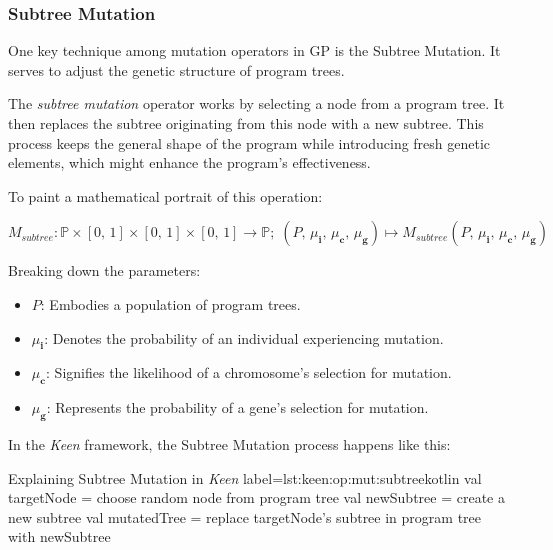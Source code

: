 \subsubsection{Subtree Mutation}
\label{sec:keen:op:mut:subtree}
    One key technique among mutation operators in GP is the Subtree Mutation. It serves to adjust the genetic structure 
    of program trees.

    \begin{definition}
        The \textit{subtree mutation} operator works by selecting a node from a program tree. It then replaces the 
        subtree originating from this node with a new subtree. This process keeps the general shape of the program while 
        introducing fresh genetic elements, which might enhance the program's effectiveness.

        To paint a mathematical portrait of this operation:

        \begin{equation}
        M_{subtree}: \mathbb{P} \times [0,\, 1] \times [0,\, 1] \times [0,\, 1] \rightarrow \mathbb{P};\;
        (P,\, \mu_\textbf{i},\, \mu_\textbf{c},\, \mu_\textbf{g}) 
            \mapsto M_{subtree}(P,\, \mu_\textbf{i},\, \mu_\textbf{c},\, \mu_\textbf{g})
        \end{equation}

        Breaking down the parameters:

        \begin{itemize}
        \item \(P\): Embodies a population of program trees.
        \item \(\mu_\textbf{i}\): Denotes the probability of an individual experiencing mutation.
        \item \(\mu_\textbf{c}\): Signifies the likelihood of a chromosome's selection for mutation.
        \item \(\mu_\textbf{g}\): Represents the probability of a gene's selection for mutation.
        \end{itemize}
    \end{definition}

    In the \textit{Keen} framework, the Subtree Mutation process happens like this:

    \begin{code}{
        Explaining Subtree Mutation in \textit{Keen}
    }{label=lst:keen:op:mut:subtree}{kotlin}
        val targetNode = choose random node from program tree
        val newSubtree = create a new subtree
        val mutatedTree = replace targetNode's subtree in program tree with newSubtree
    \end{code}

